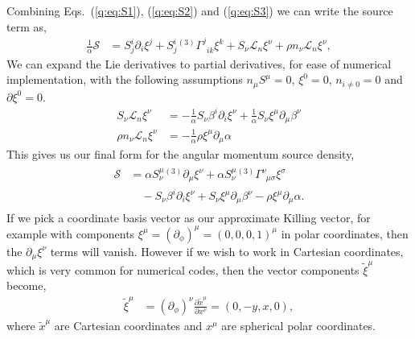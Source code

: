 Combining Eqs.~(\ref{q:eq:S1}), (\ref{q:eq:S2}) and (\ref{q:eq:S3}) we can write the source term as,
\begin{align}
\frac{1}{\alpha}\mathcal{S} &= S^i_{j}\partial_i \xi^j + S^i_{j} {}^{(3)}\Gamma^j_{\,\,\,i k} \xi^k + S_\nu \mathcal{L}_n \xi^\nu + \rho n_\nu \mathcal{L}_n \xi^\nu,
\end{align}
We can expand the Lie derivatives to partial derivatives, for ease of numerical implementation, with the following assumptions $n_\mu S^\mu = 0$, $\xi^0 = 0$, $n_{i\neq0}=0$ and $\partial \xi^0 = 0$.
\begin{align}
S_\nu \mathcal{L}_n \xi^\nu &= -\frac{1}{\alpha} S_\nu \beta^i \partial_i \xi^\nu  + \frac{1}{\alpha}S_\nu \xi^\mu \partial_\mu \beta^\nu \\
\rho n_\nu \mathcal{L}_n \xi^\nu &= -\frac{1}{\alpha} \rho \xi^\mu \partial_\mu \alpha 
\end{align}
This gives us our final form for the angular momentum source density,
\begin{align}\label{q:s_explicit} 
\begin{split}
\mathcal{S} &= \alpha S^\mu_{\nu}{}^{(3)}\partial_\mu \xi^\nu + \alpha S^\mu_{\nu} {}^{(3)}\Gamma^\nu_{\,\,\,\mu \sigma} \xi^\sigma \\&\quad- S_\nu \beta^i \partial_i \xi^\nu  + S_\nu \xi^\mu \partial_\mu \beta^\nu - \rho \xi^\mu \partial_\mu \alpha.
\end{split}
\end{align}
If we pick a coordinate basis vector as our approximate Killing vector, for example with components $\xi^\mu = (\partial_\phi)^\mu =(0,0,0,1)^\mu$ in polar coordinates, then the $\partial_\mu \xi^\nu$ terms will vanish. However if we wish to work in Cartesian coordinates, which is very common for numerical codes, then the vector components $\tilde\xi^\mu$ become,
\begin{align}
\tilde \xi ^\mu  &= (\partial_\phi)^\nu \frac{\partial \tilde x^\mu}{\partial x^\nu}=  (0,-y,x,0),
\end{align}
where $\tilde x^\mu$ are Cartesian coordinates and $x^\mu$ are spherical polar coordinates.



